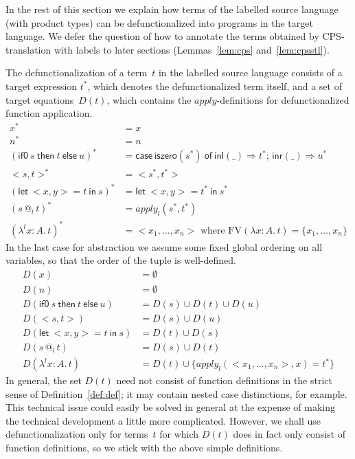 \documentclass{LMCS}
\makeatletter
\theoremstyle{definition}
\theoremstyle{plain}
\newcommand{\kw}[1]{\mathsf{#1}}
\newcommand{\Capply}{\textit{apply}}
\newcommand{\tlaml}[4]{\lambda^{#3} {#1}{:}{#2}.\, {#4}}
\newcommand{\tlami}[3]{\lambda {#1}{:}{#2}.\, {#3}}
\newcommand{\tappl}[3]{{#1} {\,@_{#2}\,} {#3}}
\newcommand{\tlet}[3]{\kw{let}\ #2=#1\ \kw{in}\ #3}
\newcommand{\tif}[3]{\kw{if0}\ #1\ \kw{then}\ #2\ \kw{else}\ #3}
\newcommand{\tcase}[5]{\kw{case}\ #1\ \kw{of}\ \kw{inl}(#2) \Rightarrow #3;\, \kw{inr}(#4) \Rightarrow #5}
\makeatother
\begin{document}
In the rest of this section we explain how terms of
the labelled source language (with product types)
can be defunctionalized into programs in the target language. 
We defer the question of how to annotate the terms obtained by 
CPS-translation with labels to later sections (Lemmas~\ref{lem:cps} and~\ref{lem:cpsstl}).

The defunctionalization of a term~$t$ in the labelled source
language consists of a target expression $t^*$, which 
denotes the defunctionalized term itself, 
and a set of target equations~$D(t)$, which contains
the $\Capply$-definitions for defunctionalized function
application.
\begin{align*}
  x^* &= x\\
  n^* &= n\\
  (\tif s {t} {u})^* &= \tcase {\kw{iszero}(s^*)} {\_} {t^*} {\_} {u^*} \\
  <s,t>^* &= <s^*, t^*>\\
  (\tlet t {<x,y>} s)^* &= \tlet{t^*}{<x,y>}{s^*}\\
  (\tappl s l t)^* &= \textit{apply}_l(s^*, t^*) \\  
  (\tlaml x A l t)^* &= {<x_1,\dots, x_n>} \text{ where $\mathrm{FV}(\tlami x A t)=\{x_1,\dots, x_n\}$}
\end{align*}
In the last case for abstraction we assume some fixed global ordering on all
variables, so that the order of the tuple is well-defined.
\begin{align*}
  D(x) &= \emptyset\\
  D(n) &= \emptyset\\
  D(\tif s {t} {u}) &= D(s)\cup D(t)\cup D(u) \\
  D(<s,t>) &= D(s) \cup D(u) \\
  D(\tlet t {<x,y>} s) &= D(t) \cup D(s) \\
  D(\tappl s l t) &= D(s) \cup D(t) \\  
  D(\tlaml x A l t) &= D(t) \cup \{\textit{apply}_l(<x_1,\dots, x_n>, x)=t^*\} 
\end{align*}
In general, the set
$D(t)$ need not consist of function definitions in the strict
sense of Definition~\ref{def:def};
it may contain nested case distinctions, for example.
This technical issue could easily be solved in general at the expense
of making the technical development a little more complicated.
However, we shall use defunctionalization only for terms~$t$ for which $D(t)$ 
does in fact only consist of function definitions, so we
stick with the above simple definitions. 
\end{document}

